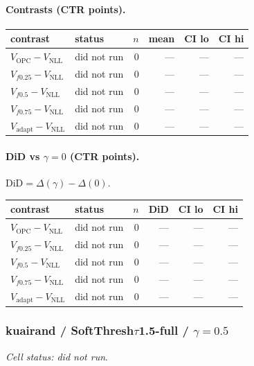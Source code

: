 \documentclass[10pt,a4paper]{article}
\begin{document}
\paragraph{Contrasts (CTR points).}
{\centering\small\begin{tabular}{llrrrr}
\toprule contrast & status & $n$ & mean & CI lo & CI hi \\
\midrule
$V_{\mathrm{OPC}}-V_{\mathrm{NLL}}$ & did not run & 0 & --- & --- & --- \\
$V_{f0.25}-V_{\mathrm{NLL}}$ & did not run & 0 & --- & --- & --- \\
$V_{f0.5}-V_{\mathrm{NLL}}$ & did not run & 0 & --- & --- & --- \\
$V_{f0.75}-V_{\mathrm{NLL}}$ & did not run & 0 & --- & --- & --- \\
$V_{\mathrm{adapt}}-V_{\mathrm{NLL}}$ & did not run & 0 & --- & --- & --- \\
\bottomrule\end{tabular}\par}
\paragraph{DiD vs $\gamma=0$ (CTR points).} $\mathrm{DiD}=\Delta(\gamma)-\Delta(0)$.
{\centering\small\begin{tabular}{llrrrr}
\toprule contrast & status & $n$ & DiD & CI lo & CI hi \\
\midrule
$V_{\mathrm{OPC}}-V_{\mathrm{NLL}}$ & did not run & 0 & --- & --- & --- \\
$V_{f0.25}-V_{\mathrm{NLL}}$ & did not run & 0 & --- & --- & --- \\
$V_{f0.5}-V_{\mathrm{NLL}}$ & did not run & 0 & --- & --- & --- \\
$V_{f0.75}-V_{\mathrm{NLL}}$ & did not run & 0 & --- & --- & --- \\
$V_{\mathrm{adapt}}-V_{\mathrm{NLL}}$ & did not run & 0 & --- & --- & --- \\
\bottomrule\end{tabular}\par}
\bigskip
\subsubsection{kuairand / SoftThresh$\tau$1.5-full / $\gamma=0.5$}
\emph{Cell status: did not run}.
\end{document}
